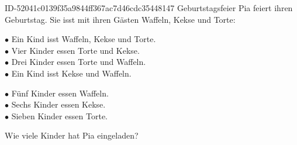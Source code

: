 \begin{exercise}
      {ID-52041c0139f35a9844ff367ac7d46cdc35448147}
      {Geburtstagsfeier}
  \ifproblem\problem
    Pia feiert ihren Geburtstag. Sie isst mit ihren Gästen Waffeln, Kekse
    und Torte:\par
    \begin{minipage}[t]{0.52\textwidth}
      $\bullet$ Ein Kind isst Waffeln, Kekse und Torte.\\[1ex]
      $\bullet$ Vier Kinder essen Torte und Kekse.\\[1ex]
      $\bullet$ Drei Kinder essen Torte und Waffeln.\\[1ex]
      $\bullet$ Ein Kind isst Kekse und Waffeln.
    \end{minipage}\hfill
    \begin{minipage}[t]{0.45\textwidth}
      $\bullet$ Fünf Kinder essen Waffeln.\\[1ex]
      $\bullet$ Sechs Kinder essen Kekse.\\[1ex]
      $\bullet$ Sieben Kinder essen Torte.
    \end{minipage}\bigskip\par
    Wie viele Kinder hat Pia eingeladen?
  \fi
\end{exercise}
